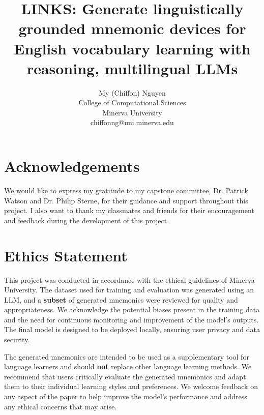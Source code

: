 \documentclass[11pt]{article}
\title{\textbf{LINKS}: Generate linguistically grounded mnemonic devices for English vocabulary learning with reasoning, multilingual LLMs
}
\author{%
  My (Chiffon) Nguyen \\
  College of Computational Sciences \\
  Minerva University \\
  chiffonng@uni.minerva.edu
}
\begin{document}


\maketitle








\section*{Acknowledgements}
We would like to express my gratitude to my capstone committee, Dr. Patrick Watson and Dr. Philip Sterne, for their guidance and support throughout this project. I also want to thank my classmates and friends for their encouragement and feedback during the development of this project.

\section*{Ethics Statement}
This project was conducted in accordance with the ethical guidelines of Minerva University. The dataset used for training and evaluation was generated using an LLM, and a \textbf{subset} of generated mnemonics were reviewed for quality and appropriateness. We acknowledge the potential biases present in the training data and the need for continuous monitoring and improvement of the model's outputs. The final model is designed to be deployed locally, ensuring user privacy and data security.

The generated mnemonics are intended to be used as a supplementary tool for language learners and should \textbf{not} replace other language learning methods. We recommend that users critically evaluate the generated mnemonics and adapt them to their individual learning styles and preferences. We welcome feedback on any aspect of the paper to help improve the model's performance and address any ethical concerns that may arise.


\clearpage


\end{document}
